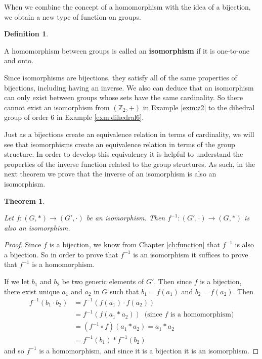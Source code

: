 \documentclass[
]{book}
\newtheorem{theorem}{Theorem}[chapter]
\theoremstyle{definition}
\newtheorem{definition}{Definition}[chapter]
\theoremstyle{definition}
\theoremstyle{definition}
\theoremstyle{definition}
\theoremstyle{remark}
\begin{document}
When we combine the concept of a homomorphism with the idea of a bijection, we obtain a new type of function on groups.

\begin{definition}
\protect\hypertarget{def:unlabeled-div-88}{}\label{def:unlabeled-div-88}

A homomorphism between groups is called an \textbf{isomorphism} if it is one-to-one and onto.

\end{definition}

Since isomorphisms are bijections, they satisfy all of the same properties of bijections, including having an inverse. We also can deduce that an isomorphism can only exist between groups whose sets have the same cardinality. So there cannot exist an isomorphism from \((\mathbb{Z}_2,+)\) in Example \ref{exm:z2} to the dihedral group of order 6 in Example \ref{exm:dihedral6}.

Just as a bijections create an equivalence relation in terms of cardinality, we will see that isomorphisms create an equivalence relation in terms of the group structure. In order to develop this equivalency it is helpful to understand the properties of the inverse function related to the group structures. As such, in the next theorem we prove that the inverse of an isomorphism is also an isomorphism.

\begin{theorem}
\protect\hypertarget{thm:unlabeled-div-89}{}\label{thm:unlabeled-div-89}

Let \(f:(G,*)\rightarrow (G',\cdot)\) be an isomorphism. Then \(f^{-1}:(G',\cdot)\rightarrow (G,*)\) is also an isomorphism.

\end{theorem}

\begin{proof}

Since \(f\) is a bijection, we know from Chapter \ref{ch:function} that \(f^{-1}\) is also a bijection. So in order to prove that \(f^{-1}\) is an isomorphism it suffices to prove that \(f^{-1}\) is a homomorphism.

If we let \(b_1\) and \(b_2\) be two generic elements of \(G'\). Then since \(f\) is a bijection, there exist unique \(a_1\) and \(a_2\) in \(G\) such that \(b_1=f(a_1)\) and \(b_2=f(a_2)\). Then
\begin{align*}
  f^{-1}(b_1 \cdot b_2) &= f^{-1}\left( f(a_1)\cdot f(a_2)\right) \\
  &= f^{-1} \left(f(a_1*a_2)\right) \: \mbox{ (since } f \mbox{ is a homomorphism)} \\
  &= (f^{-1}\circ f) (a_1*a_2) = a_1*a_2 \\
  &= f^{-1}(b_1)* f^{-1}(b_2) 
\end{align*}
and so \(f^{-1}\) is a homomorphism, and since it is a bijection it is an isomorphism.

\end{proof}
\end{document}
